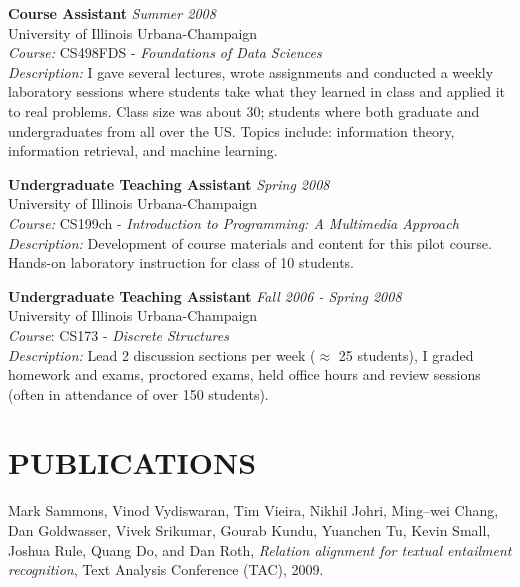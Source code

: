 \documentclass{report}
\begin{document}
{\bf Course Assistant} \hfill {\it Summer 2008} \\
University of Illinois Urbana-Champaign \\
{\sl Course:} CS498FDS - {\sl Foundations of Data Sciences} \\
{\sl Description:} I gave several lectures, wrote assignments and conducted a weekly laboratory sessions where students take what they learned in class and applied it to real problems. Class size was about 30; students where both graduate and undergraduates from all over the US. Topics include: information theory, information retrieval, and machine learning.
				
{\bf Undergraduate Teaching Assistant} \hfill {\it Spring 2008} \\
University of Illinois Urbana-Champaign \\
{\sl Course:} CS199ch - {\sl Introduction to Programming: A Multimedia             Approach} \\
{\sl Description:} Development of course materials and content for this         pilot course. Hands-on laboratory instruction for class of 10 students.

{\bf Undergraduate Teaching Assistant} \hfill {\it Fall 2006 - Spring 2008} \\
University of Illinois Urbana-Champaign \\
{\sl Course}: CS173 - {\sl Discrete Structures} \\
{\sl Description:} Lead 2 discussion sections per week ($\approx$ 25 students), I graded homework and exams, proctored exams, held office hours and review sessions (often in attendance of over 150 students).

\section*{PUBLICATIONS} 

%
%

Mark Sammons, Vinod Vydiswaran, Tim Vieira, Nikhil Johri, Ming--wei Chang,
Dan Goldwasser, Vivek Srikumar, Gourab Kundu, Yuanchen Tu, Kevin Small,
Joshua Rule, Quang Do, and Dan Roth, \emph{Relation alignment for textual entailment recognition}, Text Analysis Conference (TAC), 2009.
\end{document}
